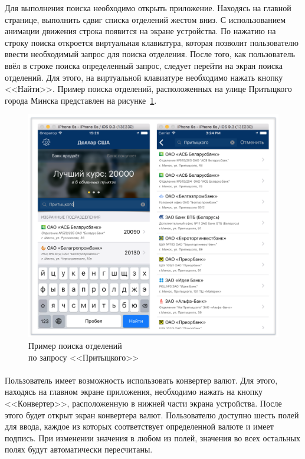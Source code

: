 Для выполнения поиска необходимо открыть приложение. Находясь на главной странице,
выполнить сдвиг списка отделений жестом вниз. С использованием анимации движения
строка появится на экране устройства. По нажатию на строку поиска откроется
виртуальная клавиатура, которая позволит пользователю ввести необходимый запрос
для поиска отделения. После того, как пользователь ввёл в строке поиска
определенный запрос, следует перейти на экран поиска отделений. Для этого,
на виртуальной клавиатуре необходимо нажать кнопку <<Найти>>.
Пример поиска отделений, расположенных на улице Притыцкого города Минска
представлен на рисунке~\ref{fig:search_by_address_manual}.
\begin{figure}[h!]
  \centering
  \includegraphics[width=140mm]{fig/search_by_address_manual}
  \caption{Пример поиска отделений \\ по запросу <<Притыцкого>>}
  \label{fig:search_by_address_manual}
\end{figure}



\paragraph{}

Пользователь имеет возможность использовать конвертер валют. Для этого,
находясь на главном экране приложения, необходимо нажать на кнопку <<Конвертер>>,
расположенную в нижней части экрана устройства. После этого будет открыт экран
конвертера валют. Пользователю доступно шесть полей для ввода, каждое из которых
соответствует определенной валюте и имеет подпись. При изменении значения в
любом из полей, значения во всех остальных полях будут автоматически пересчитаны.

